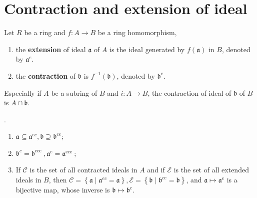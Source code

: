 \section{Contraction and extension of ideal} %
\begin{definition}
    Let $R$ be a ring and $f:A \rightarrow B$ be a ring homomorphism, \begin{enumerate}
        \item
              the \textbf{extension} of ideal $\mathfrak{a}$ of $A$ is the ideal generated by $f\left(\mathfrak{a}\right)$ in $B$, denoted by $\mathfrak{a}^e$.

        \item
              the \textbf{contraction} of $\mathfrak{b}$ is $f^{-1}\left(\mathfrak{b}\right)$, denoted by $\mathfrak{b}^c$.
    \end{enumerate}
    Especially if $A$ be a subring of $B$ and $i: A\rightarrow B$, the contraction of ideal of $\mathfrak{b}$ of $B$ is $A\cap \mathfrak{b}$.
\end{definition}

\begin{proposition}
    \label{pro: Contraction and extension}
    .
    \begin{enumerate}
        \item $\mathfrak{a} \subseteq \mathfrak{a}^{e c}, \mathfrak{b} \supseteq \mathfrak{b}^{c e}$;
        \item  $\mathfrak{b}^c=\mathfrak{b}^{\text {cec }}, \mathfrak{a}^e=\mathfrak{a}^{\text {ece }}$;
        \item  If $\mathcal{C}$ is the set of all contracted ideals in $A$ and if $\mathcal{E}$ is the set of all extended ideals in $B$, then $\mathcal{C}=\left\{\mathfrak{a} \mid \mathfrak{a}^{e c}=\mathfrak{a}\right\}, \mathcal{E}=\left\{\mathfrak{b} \mid \mathfrak{b}^{c e}=\mathfrak{b}\right\}$, and $\mathfrak{a} \mapsto \mathfrak{a}^e$ is a bijective map, whose inverse is $\mathfrak{b} \mapsto \mathfrak{b}^c$.
    \end{enumerate}
\end{proposition}


